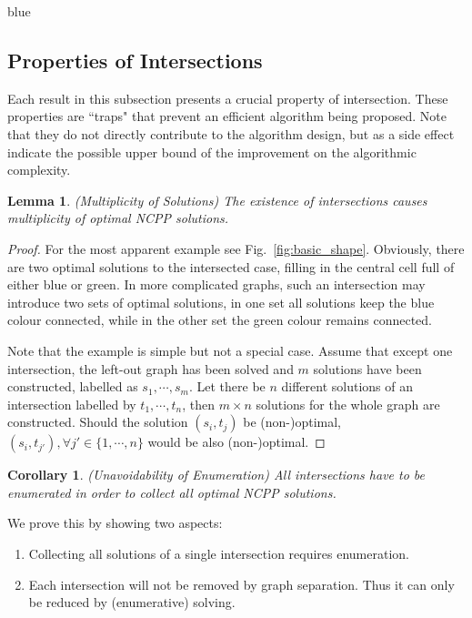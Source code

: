 \documentclass[journal]{IEEEtran}
\newtheorem{lemma}[theorem]{Lemma}
\newtheorem{corollary}[theorem]{Corollary}
\begin{document}
\begin{color}{blue}
 

\subsection{Properties of Intersections}
Each result in this subsection presents a crucial property of intersection. These properties are ``traps" that prevent an efficient algorithm being proposed. 
Note that they do not directly contribute to the algorithm design, but as a side effect indicate the possible upper bound of the improvement on the algorithmic complexity. 


\begin{lemma}
(Multiplicity of Solutions) The existence of intersections causes multiplicity of optimal NCPP solutions. 
\end{lemma}
\begin{proof}
For the most apparent example see Fig.~\ref{fig:basic_shape}. Obviously, there are two optimal solutions to the intersected case, filling in the central cell full of either blue or green. 
In more complicated graphs, such an intersection may introduce two sets of optimal solutions, in one set all solutions keep the blue colour connected, 
while in the other set the green colour remains connected. 

Note that the example is simple but not a special case. Assume that except one intersection, the left-out graph has been solved and $m$ solutions have been constructed, labelled as $s_1, \cdots, s_m$. Let there be $n$ different solutions of an intersection labelled by $t_1, \cdots, t_n$, then $m\times n$ solutions for the whole graph are constructed. 
Should the solution $(s_i, t_j)$ be (non-)optimal, $(s_i, t_{j'}), \forall j'\in \{1, \cdots, n\}$ would be also (non-)optimal. 
\end{proof}


\begin{corollary}
(Unavoidability of Enumeration) All intersections have to be enumerated in order to collect all optimal NCPP solutions. 
\end{corollary}

We prove this by showing two aspects:  
\begin{enumerate}
\item Collecting all solutions of a single intersection requires enumeration. 
\item Each intersection will not be removed by graph separation. Thus it can only be reduced by (enumerative) solving. 
\end{enumerate}
\end{color}
\end{document}
